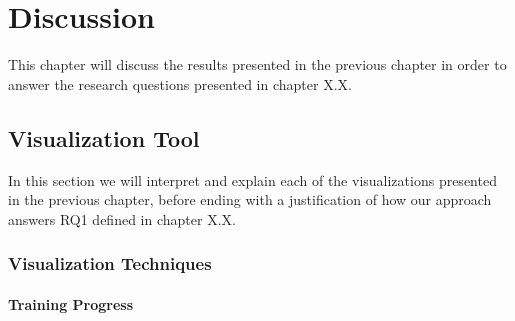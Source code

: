 
\chapter{Discussion}

This chapter will discuss the results presented in the previous chapter in order to answer the research questions presented in chapter X.X.

\begin{comment}

RQ 1:How can we develop a visualization tool to improve the understanding of the behaviour of an artificial neural network?

RO 1.1: Examine existing tools in order to uncover shortcomings.
RO 1.2: Identify visualization techniques that can be used to improve the understanding of an artificial neural network.
RO 1.3: Develop a tool that incorporates the techniques found in 1.2 and addresses the shortcomings identified in 1.1.

\end{comment}

\section{Visualization Tool}

In this section we will interpret and explain each of the visualizations presented in the previous chapter, before ending with a justification of how our approach answers RQ1 defined in chapter X.X.




\subsection{Visualization Techniques}


\subsubsection{Training Progress}

